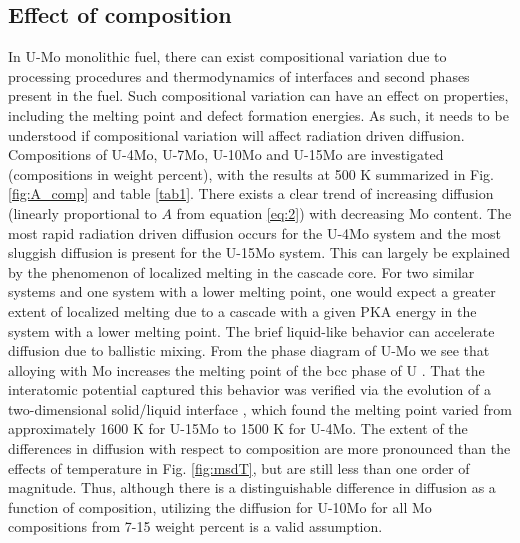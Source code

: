 \documentclass[review]{elsarticle}
\begin{document}
\FloatBarrier

\subsection{Effect of composition}

In U-Mo monolithic fuel, there can exist compositional variation due to processing procedures and thermodynamics of interfaces and second phases present in the fuel. Such compositional variation can have an effect on properties, including the melting point and defect formation energies. As such, it needs to be understood if compositional variation will affect radiation driven diffusion. Compositions of U-4Mo, U-7Mo, U-10Mo and U-15Mo are investigated (compositions in weight percent), with the results at 500 K summarized in Fig. \ref{fig:A_comp} and table \ref{tab1}. There exists a clear trend of increasing diffusion (linearly proportional to $A$ from equation \ref{eq:2}) with decreasing Mo content. The most rapid radiation driven diffusion occurs for the U-4Mo system and the most sluggish diffusion is present for the U-15Mo system. This can largely be explained by the phenomenon of localized melting in the cascade core. For two similar systems and one system with a lower melting point, one would expect a greater extent of localized melting due to a cascade with a given PKA energy in the system with a lower melting point. The brief liquid-like behavior can accelerate diffusion due to ballistic mixing. From the phase diagram of U-Mo we see that alloying with Mo increases the melting point of the bcc phase of U \cite{umo_handbook}. That the interatomic potential captured this behavior was verified via the evolution of a two-dimensional solid/liquid interface \cite{moore2015}, which found the melting point varied from approximately 1600 K for U-15Mo to 1500 K for U-4Mo. The extent of the differences in diffusion with respect to composition are more pronounced than the effects of temperature in Fig. \ref{fig:msdT}, but are still less than one order of magnitude. Thus, although there is a distinguishable difference in diffusion as a function of composition, utilizing the diffusion for U-10Mo for all Mo compositions from 7-15 weight percent is a valid assumption. 
\end{document}
